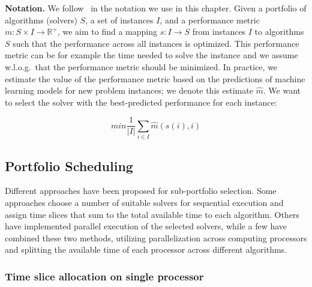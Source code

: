 \par{\textbf{Notation.}}
We follow~\cite{pmlr-v79-lindauer17a} in the notation we use in this chapter.
Given a portfolio of algorithms (solvers) $S$, a set of instances $I$, and a performance metric \begin{math} m: S \times I \to \mathbb {R^+} \end{math}, we aim to find a mapping \begin{math} s: I \to S \end{math} from instances $I$ to algorithms $S$ such that the performance across all instances is optimized. This performance metric can be for example the time needed to solve the instance and we assume w.l.o.g.\ that the performance metric should be minimized. In practice, we estimate the value of the performance metric based on the predictions of machine learning models for new problem instances; we denote this estimate $\hat{m}$. We want to select the solver with the best-predicted performance for each instance:

\begin{equation}\label{eq:1}
    min \frac{1}{|I|} \sum\limits_{i\in I} \hat{m}(s(i),i)
\end{equation}


\subsection{Portfolio Scheduling}
Different approaches have been proposed for sub-portfolio selection. Some approaches choose a number of suitable solvers for sequential execution and assign  time slices that sum to the total available time to each algorithm. Others have implemented parallel execution of the selected solvers, while a few have combined these two methods, utilizing parallelization across computing processors and splitting the available time of each processor across different algorithms. 

\subsubsection{Time slice allocation on single processor}


